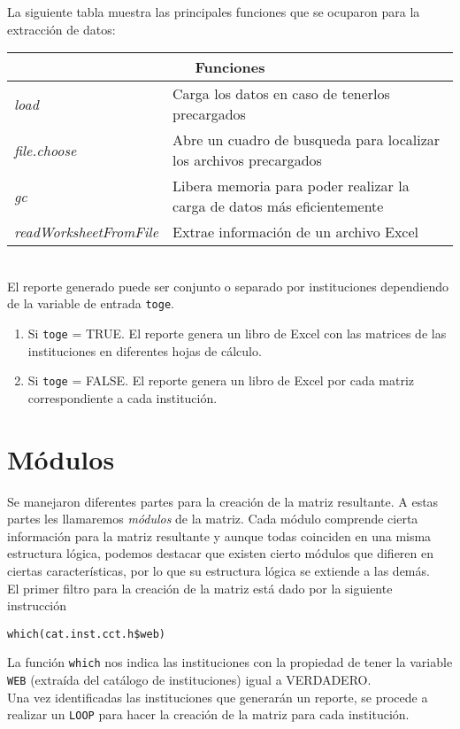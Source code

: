 \documentclass{report}
\begin{document}
La siguiente tabla muestra las principales funciones que se ocuparon para la extracción de datos:\\[0.5cm]
\begin{tabular}{ |l|p{7cm}| }
        \hline
        \multicolumn{2}{|c|}{Funciones} \\
        \hline
        \textit{load} & Carga los datos en caso de tenerlos precargados\\
        \textit{file.choose} & Abre un cuadro de busqueda para localizar los archivos precargados\\
        \textit{gc} & Libera memoria para poder realizar la carga de datos más eficientemente\\
        \textit{readWorksheetFromFile} & Extrae información de un archivo Excel\\
        \hline
    \end{tabular}
\\[0.5cm]
El reporte generado puede ser conjunto o separado por instituciones dependiendo de la variable de entrada \texttt{toge}.
\begin{enumerate}
    \item Si \texttt{toge} = TRUE. El reporte genera un libro de Excel con las matrices de las instituciones en diferentes hojas de cálculo.
    \item Si \texttt{toge} = FALSE. El reporte genera un libro de Excel por cada matriz correspondiente a cada institución.
\end{enumerate}
\section{Módulos}
Se manejaron diferentes partes para la creación de la matriz resultante. A estas partes les llamaremos \textit{módulos} de la matriz. Cada módulo comprende cierta información para la matriz resultante y aunque todas coinciden en una misma estructura lógica, podemos destacar que existen cierto módulos que difieren en ciertas características, por lo que su estructura lógica se extiende a las demás. \\

El primer filtro para la creación de la matriz está dado por la siguiente instrucción
\begin{flushleft}
\texttt{which(cat.inst.cct.h\$web)}
\end{flushleft}
La función \texttt{which} nos indica las instituciones con la propiedad de tener la variable \texttt{WEB} (extraída del catálogo de instituciones) igual a VERDADERO. \\ Una vez identificadas las instituciones que generarán un reporte, se procede a realizar un \texttt{LOOP} para hacer la creación de la matriz para cada institución.
\end{document}
